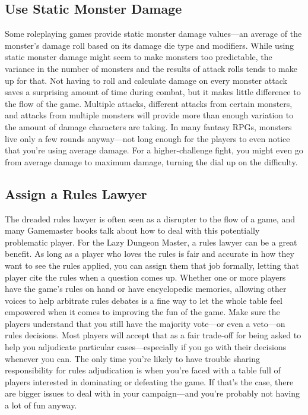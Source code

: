\documentclass[10pt,a4paper,twoside,bg=print,twocolumn,openany,nodeprecatedcode]{dndbook}
\begin{document}
\subsection{Use Static Monster Damage}
Some roleplaying games provide static monster damage values—an average of the monster's damage roll based on its damage die type and modifiers. While using static monster damage might seem to make monsters too predictable, the variance in the number of monsters and the results of attack rolls tends to make up for that.
Not having to roll and calculate damage on every monster attack saves a surprising amount of time during combat, but it makes little difference to the flow of the game. Multiple attacks, different attacks from certain monsters, and attacks from multiple monsters will provide more than enough variation to the amount of damage characters are taking. In many fantasy RPGs, monsters live only a few rounds anyway—not long enough for the players to even notice that you're using average damage. For a higher-challenge fight, you might even go from average damage to maximum damage, turning the dial up on the difficulty.
\subsection{Assign a Rules Lawyer}
The dreaded rules lawyer is often seen as a disrupter to the flow of a game, and many Gamemaster books talk about how to deal with this potentially problematic player. For the Lazy Dungeon Master, a rules lawyer can be a great benefit. As long as a player who loves the rules is fair and accurate in how they want to see the rules applied, you can assign them that job formally, letting that player cite the rules when a question comes up.
Whether one or more players have the game's rules on hand or have encyclopedic memories, allowing other voices to help arbitrate rules debates is a fine way to let the whole table feel empowered when it comes to improving the fun of the game.
Make sure the players understand that you still have the majority vote—or even a veto—on rules decisions. Most players will accept that as a fair trade-off for being asked to help you adjudicate particular cases—especially if you go with their decisions whenever you can.
The only time you're likely to have trouble sharing responsibility for rules adjudication is when you're faced with a table full of players interested in dominating or defeating the game. If that's the case, there are bigger issues to deal with in your campaign—and you're probably not having a lot of fun anyway.
\end{document}

